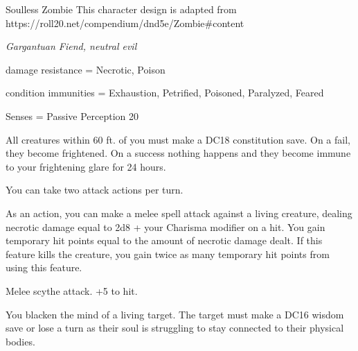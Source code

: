 \begin{monsterbox}{Soulless Zombie}
	This character design is adapted from https://roll20.net/compendium/dnd5e/Zombie#content
	\begin{hangingpar}
		\textit{Gargantuan Fiend, neutral evil}
	\end{hangingpar}
	\dndline%
	\basics[%
	armorclass = 16,
	hitpoints  = 82,
	speed      = 30 ft
	]
	\dndline%
	\stats[
	STR = \stat{9}, %
	DEX = \stat{12},
	CON = \stat{14},
	INT = \stat{16},
	WIS = \stat{22},
	CHA = \stat{10}
	]
	\dndline%
	\details[%
	languages = {Common, undead},
	challenge = 6
	]
	\dndline%
	damage resistance = Necrotic, Poison
	
	condition immunities = Exhaustion, Petrified, Poisoned, Paralyzed, Feared	
	
	Senses = Passive Perception 20
	
	\dndline%
	\begin{monsteraction}[Horrify]
		All creatures within 60 ft. of you must make a DC18 constitution save. On a fail, they become frightened. On a success nothing happens and they become immune to your frightening glare for 24 hours.
	\end{monsteraction}	
	\begin{monsteraction}[Multiattack]
		You can take two attack actions per turn.
	\end{monsteraction}
	\begin{monsteraction}
		As an action, you can make a melee spell attack against a living creature, dealing necrotic damage equal to 2d8 + your Charisma modifier on a hit. You gain temporary hit points equal to the amount of necrotic damage dealt. If this feature kills the creature, you gain twice as many temporary hit points from using this feature.
	\end{monsteraction}	
	\begin{monsteraction}
		Melee scythe attack. +5 to hit.
	\end{monsteraction}	
	\begin{monsteraction}
		You blacken the mind of a living target. The target must make a DC16 wisdom save or lose a turn as their soul is struggling to stay connected to their physical bodies.
	\end{monsteraction}		
\end{monsterbox}